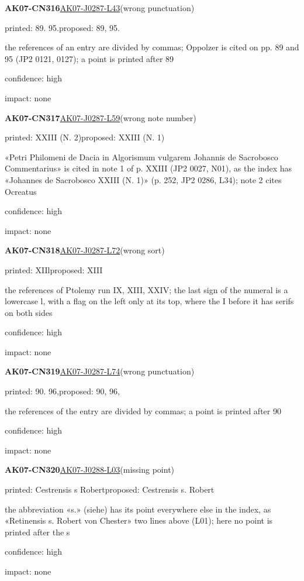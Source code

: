 \documentclass[11pt]{article}
\begin{document}
\noindent\textbf{AK07-CN316}\enspace\hyperlink{AK07-J0287-L43}{AK07-J0287-L43}\enspace(wrong punctuation)\par\noindent printed: 89. 95.\enspace proposed: 89, 95.\par\noindent the references of an entry are divided by commas; Oppolzer is cited on pp. 89 and 95 (JP2 0121, 0127); a point is printed after 89\par\noindent confidence: high\par\noindent impact: none\par\medskip
\noindent\textbf{AK07-CN317}\enspace\hyperlink{AK07-J0287-L59}{AK07-J0287-L59}\enspace(wrong note number)\par\noindent printed: XXIII (N. 2)\enspace proposed: XXIII (N. 1)\par\noindent «Petri Philomeni de Dacia in Algorismum vulgarem Johannis de Sacrobosco Commentarius» is cited in note 1 of p. XXIII (JP2 0027, N01), as the index has «Johannes de Sacrobosco XXIII (N. 1)» (p. 252, JP2 0286, L34); note 2 cites Ocreatus\par\noindent confidence: high\par\noindent impact: none\par\medskip
\noindent\textbf{AK07-CN318}\enspace\hyperlink{AK07-J0287-L72}{AK07-J0287-L72}\enspace(wrong sort)\par\noindent printed: XIIl\enspace proposed: XIII\par\noindent the references of Ptolemy run IX, XIII, XXIV; the last sign of the numeral is a lowercase l, with a flag on the left only at its top, where the I before it has serifs on both sides\par\noindent confidence: high\par\noindent impact: none\par\medskip
\noindent\textbf{AK07-CN319}\enspace\hyperlink{AK07-J0287-L74}{AK07-J0287-L74}\enspace(wrong punctuation)\par\noindent printed: 90. 96,\enspace proposed: 90, 96,\par\noindent the references of the entry are divided by commas; a point is printed after 90\par\noindent confidence: high\par\noindent impact: none\par\medskip
\noindent\textbf{AK07-CN320}\enspace\hyperlink{AK07-J0288-L03}{AK07-J0288-L03}\enspace(missing point)\par\noindent printed: Cestrensis s Robert\enspace proposed: Cestrensis s. Robert\par\noindent the abbreviation «s.» (siehe) has its point everywhere else in the index, as «Retinensis s. Robert von Chester» two lines above (L01); here no point is printed after the s\par\noindent confidence: high\par\noindent impact: none\par\medskip
\end{document}
